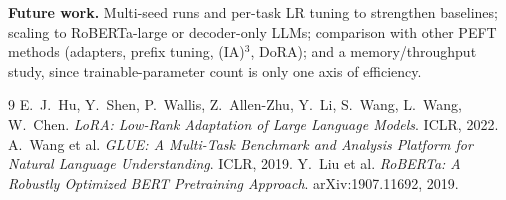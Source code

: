 \documentclass[11pt]{article}
\begin{document}
\textbf{Future work.} Multi-seed runs and per-task LR tuning to strengthen baselines; scaling to RoBERTa-large or decoder-only LLMs; comparison with other PEFT methods (adapters, prefix tuning, (IA)$^3$, DoRA); and a memory/throughput study, since trainable-parameter count is only one axis of efficiency.

\begin{thebibliography}{9}\small
{} E.~J.~Hu, Y.~Shen, P.~Wallis, Z.~Allen-Zhu, Y.~Li, S.~Wang, L.~Wang, W.~Chen. \textit{LoRA: Low-Rank Adaptation of Large Language Models}. ICLR, 2022.
 A.~Wang et al. \textit{GLUE: A Multi-Task Benchmark and Analysis Platform for Natural Language Understanding}. ICLR, 2019.
 Y.~Liu et al. \textit{RoBERTa: A Robustly Optimized BERT Pretraining Approach}. arXiv:1907.11692, 2019.
\end{thebibliography}
\end{document}
